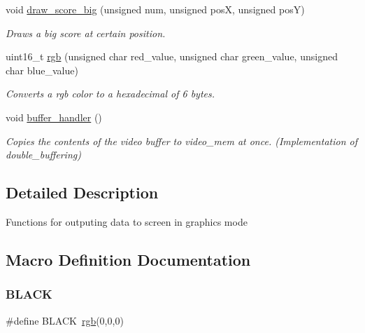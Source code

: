 \begin{DoxyCompactItemize}
$$void \hyperlink{group__video__gr_ga975522708082967d9d107c340e6c01f5}{draw\+\_\+score\+\_\+big} (unsigned num, unsigned posX, unsigned posY)
\begin{DoxyCompactList}\small\item\em Draws a big score at certain position. \end{DoxyCompactList}\item 
uint16\+\_\+t \hyperlink{group__video__gr_gafcc897567998ed3a26974926501a4abd}{rgb} (unsigned char red\+\_\+value, unsigned char green\+\_\+value, unsigned char blue\+\_\+value)
\begin{DoxyCompactList}\small\item\em Converts a rgb color to a hexadecimal of 6 bytes. \end{DoxyCompactList}\item 
void \hyperlink{group__video__gr_ga1cf21cb9ef69ad19a5de13ff77a8c798}{buffer\+\_\+handler} ()
\begin{DoxyCompactList}\small\item\em Copies the contents of the video buffer to video\+\_\+mem at once. (Implementation of double\+\_\+buffering) \end{DoxyCompactList}\end{DoxyCompactItemize}


\subsection{Detailed Description}
Functions for outputing data to screen in graphics mode 

\subsection{Macro Definition Documentation}
\hypertarget{group__video__gr_ga7b3b25cba33b07c303f3060fe41887f6}{}\label{group__video__gr_ga7b3b25cba33b07c303f3060fe41887f6} 
\subsubsection{\texorpdfstring{B\+L\+A\+CK}{BLACK}}
{\footnotesize\ttfamily \#define B\+L\+A\+CK~\hyperlink{group__video__gr_gafcc897567998ed3a26974926501a4abd}{rgb}(0,0,0)}

\hypertarget{group__video__gr_ga6f699060902f800f12aaae150f3a708e}{}\label{group__video__gr_ga6f699060902f800f12aaae150f3a708e} 
